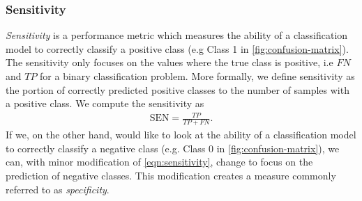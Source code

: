 \subsubsection{Sensitivity}
\label{sec:sensitivity}
\textit{Sensitivity} is a performance metric which measures the ability of a classification model to correctly classify a positive class (e.g Class 1 in \cref{fig:confusion-matrix}). The sensitivity only focuses on the values where the true class is positive, i.e $FN$ and $TP$ for a binary classification problem. More formally, we define sensitivity as the portion of correctly predicted positive classes to the number of samples with a positive class. We compute the sensitivity as
\begin{align}
    \text{SEN} = \frac{TP}{TP + FN}.
    \label{eqn:sensitivity}
\end{align}
If we, on the other hand, would like to look at the ability of a classification model to correctly classify a negative class (e.g. Class 0 in \cref{fig:confusion-matrix}), we can, with minor modification of \cref{eqn:sensitivity}, change to focus on the prediction of negative classes. This modification creates a measure commonly referred to as \textit{specificity}.